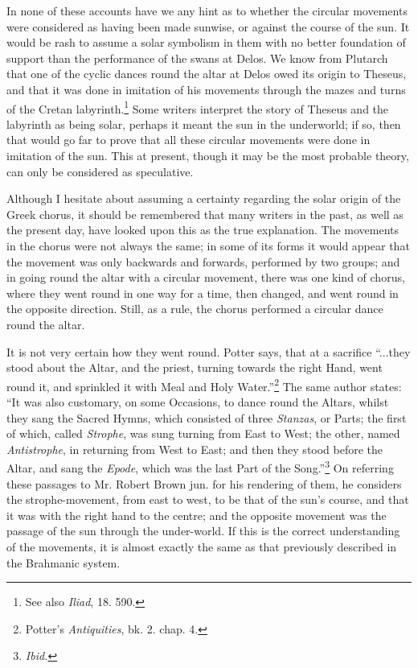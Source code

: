 \documentclass[a4paper, 11pt, oneside, polutonikogreek, english]{article}
\begin{document}
In none of these accounts have we any hint as to whether the circular movements were considered as having been made sunwise, or against the course of the sun. It would be rash to assume a solar symbolism in them with no better foundation of support than the performance of the swans at Delos. We know from Plutarch that one of the cyclic dances round the altar at Delos owed its origin to Theseus, and that it was done in imitation of his movements through the mazes and turns of the Cretan labyrinth.\footnote{See also \emph{Iliad}, 18. 590.} Some writers interpret the story of Theseus and the labyrinth as being solar, perhaps it meant the sun in the underworld; if so, then that would go far to prove that all these circular movements were done in imitation of the sun. This at present, though it may be the most probable theory, can only be considered as speculative.

Although I hesitate about assuming a certainty regarding the solar origin of the Greek chorus, it should be remembered that many writers in the past, as well as the present day, have looked upon this as the true explanation. The movements in the chorus were not always the same; in some of its forms it would appear that the movement was only backwards and forwards, performed by two groups; and in going round the altar with a circular movement, there was one kind of chorus, where they went round in one way for a time, then changed, and went round in the opposite direction. Still, as a rule, the chorus performed a circular dance round the altar.

It is not very certain how they went round. Potter says, that at a sacrifice ``...they stood about the Altar, and the priest, turning towards the right Hand, went round it, and sprinkled it with Meal and Holy Water.''\footnote{Potter's \emph{Antiquities}, bk. 2. chap. 4.} The same author states: ``It was also customary, on some Occasions, to dance round the Altars, whilst they sang the Sacred Hymns, which consisted of three \emph{Stanzas}, or Parts; the first of which, called \emph{Strophe}, was sung turning from East to West; the other, named \emph{Antistrophe}, in returning from West to East; and then they stood before the Altar, and sang the \emph{Epode}, which was the last Part of the Song.''\footnote{\emph{Ibid.}} On referring these passages to Mr. Robert Brown jun. for his rendering of them, he considers the strophe-movement, from east to west, to be that of the sun's course, and that it was with the right hand to the centre; and the opposite movement was the passage of the sun through the under-world. If this is the correct understanding of the movements, it is almost exactly the same as that previously described in the Brahmanic system.
\end{document}
